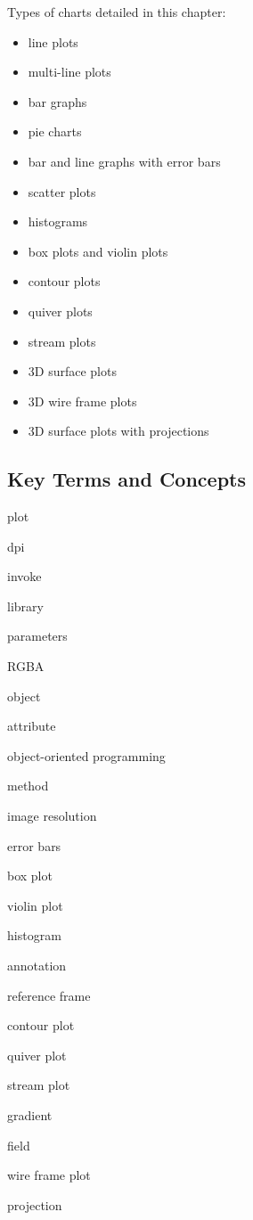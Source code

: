 \documentclass{book}
\newenvironment{key_terms}{\begin{multicols}{3}}{\end{multicols}} %
\begin{document}
Types of charts detailed in this chapter:

\begin{itemize}
\item
  line plots
\item
  multi-line plots
\item
  bar graphs
\item
  pie charts
\item
  bar and line graphs with error bars
\item
  scatter plots
\item
  histograms
\item
  box plots and violin plots
\item
  contour plots
\item
  quiver plots
\item
  stream plots
\item
  3D surface plots
\item
  3D wire frame plots
\item
  3D surface plots with projections
\end{itemize}
    




    
        \hypertarget{key-terms-and-concepts}{%
\subsection{Key Terms and Concepts}\label{key-terms-and-concepts}}
    




    
        \begin{key_terms}
        plot

dpi

invoke

library

parameters

RGBA

object

attribute

object-oriented programming

method

image resolution

error bars

box plot

violin plot

histogram

annotation

reference frame

contour plot

quiver plot

stream plot

gradient

field

wire frame plot

projection
        \end{key_terms}
\end{document}
